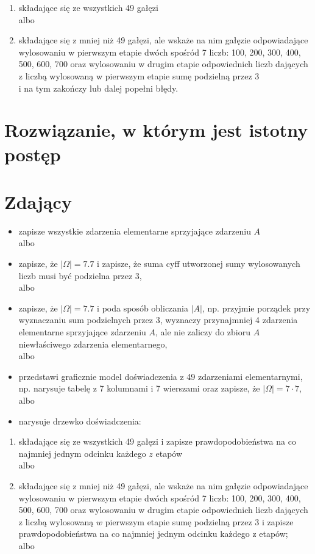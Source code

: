 \documentclass[10pt]{article}
\begin{document}
\begin{enumerate}
  \item składające się ze wszystkich 49 gałęzi\\
albo
  \item składające się z mniej niż 49 gałęzi, ale wskaże na nim gałęzie odpowiadające wylosowaniu w pierwszym etapie dwóch spośród 7 liczb: 100, 200, 300, 400, 500, 600, 700 oraz wylosowaniu w drugim etapie odpowiednich liczb dających z liczbą wylosowaną w pierwszym etapie sumę podzielną przez 3\\
i na tym zakończy lub dalej popełni błędy.
\end{enumerate}

\section*{Rozwiązanie, w którym jest istotny postęp}
\section*{Zdający}
\begin{itemize}
  \item zapisze wszystkie zdarzenia elementarne sprzyjające zdarzeniu $A$\\
albo
  \item zapisze, że $|\Omega|=7.7$ i zapisze, że suma cyff utworzonej sumy wylosowanych liczb musi być podzielna przez 3,\\
albo
  \item zapisze, że $|\Omega|=7.7$ i poda sposób obliczania $|A|$, np. przyjmie porządek przy wyznaczaniu sum podzielnych przez 3, wyznaczy przynajmniej 4 zdarzenia elementarne sprzyjające zdarzeniu $A$, ale nie zaliczy do zbioru $A$ niewłaściwego zdarzenia elementarnego,\\
albo
  \item przedstawi graficznie model doświadczenia z 49 zdarzeniami elementarnymi, np. narysuje tabelę z 7 kolumnami i 7 wierszami oraz zapisze, że $|\Omega|=7 \cdot 7$,\\
albo
  \item narysuje drzewko doświadczenia:
\end{itemize}

\begin{enumerate}
  \item składające się ze wszystkich 49 gałęzi i zapisze prawdopodobieństwa na co najmniej jednym odcinku każdego $z$ etapów\\
albo
  \item składające się z mniej niż 49 gałęzi, ale wskaże na nim gałęzie odpowiadające wylosowaniu w pierwszym etapie dwóch spośród 7 liczb: 100, 200, 300, 400, 500, 600, 700 oraz wylosowaniu w drugim etapie odpowiednich liczb dających z liczbą wylosowaną $w$ pierwszym etapie sumę podzielną przez 3 i zapisze prawdopodobieństwa na co najmniej jednym odcinku każdego z etapów;\\
albo
\end{enumerate}
\end{document}
